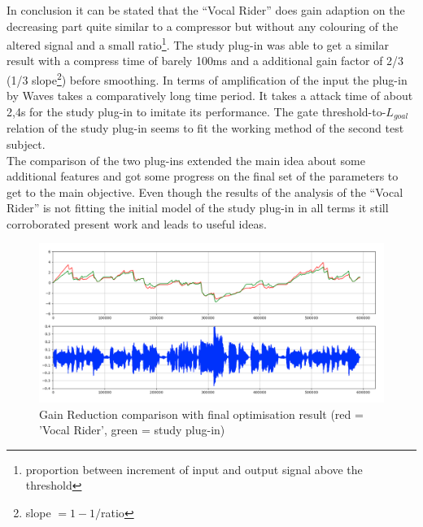 In conclusion it can be stated that the “Vocal Rider” does gain adaption on the decreasing part quite similar to a compressor but without any colouring of the altered signal and a small ratio\footnote{proportion between increment of input and output signal above the threshold}. The study plug-in was able to get a similar result with a compress time of barely 100ms and a additional gain factor of 2/3 (1/3 slope\footnote{slope $= 1 - 1/$ratio}) before smoothing. In terms of amplification of the input the plug-in by Waves takes a comparatively long time period. It takes a attack time of about 2,4s for the study plug-in to imitate its performance. The gate threshold-to-$L_{goal}$ relation of the study plug-in seems to fit the working method of the second test subject.\\
The comparison of the two plug-ins extended the main idea about some additional features and got some progress on the final set of the parameters to get to the main objective. Even though the results of the analysis of the “Vocal Rider” is not fitting the initial model of the study plug-in in all terms it still corroborated present work and leads to useful ideas.\\

\begin{figure}[H]
\includegraphics[width=\textwidth]{images/compareResult}
\caption{Gain Reduction comparison with final optimisation result (red = 'Vocal Rider', green = study plug-in)}
\end{figure}